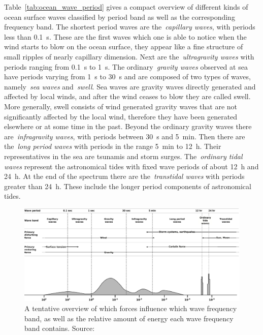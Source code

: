 Table~\ref{tab:ocean_wave_period} gives a compact overview of different kinds 
of ocean surface waves classified by period band as well as the corresponding 
frequency band. The shortest period waves are the~\emph{capillary waves}, with 
periods less than \SI{0.1}{\second}. These are the first waves which one is able to notice 
when the wind starts to blow on the ocean surface, they appear like a fine
structure of small ripples of nearly capillary dimension.
Next are the~\emph{ultragravity waves} with periods ranging from \SI{0.1}{\second}
to \SI{1}{\second}. The ordinary~\emph{gravity waves} observed at sea have periods
varying from \SI{1}{\second} to \SI{30}{\second} and are composed of two types
of waves, namely~\emph{sea waves} and~\emph{swell}.
Sea waves are gravity waves directly generated and affected by local winds,
and after the wind ceases to blow they are called swell.
More generally, swell
consists of wind generated gravity waves that are not significantly affected
by the local wind, therefore they have  been generated elsewhere or at some
time in the past.
Beyond the ordinary 
gravity waves there are~\emph{infragravity waves}, with periods between \SI{30}{\second} 
and \SI{5}{\minute}. Then there are the~\emph{long period waves} with periods in the 
range \SI{5}{\minute} to \SI{12}{\hour}. Their representatives in the sea are tsunamis 
and storm surges. The~\emph{ordinary tidal waves} represent the astronomical 
tides with fixed wave periods of about \SI{12}{\hour} and \SI{24}{\hour}. At the end of the 
spectrum there are the~\emph{transtidal waves} with periods greater than 
\SI{24}{\hour}. These include the longer period components of astronomical tides.
%
\begin{figure}
  \centering
  \includegraphics[width=\textwidth]{figures/SurfaceWavesEnergy}
  \caption[Wave frequency bands and their governing forces.]{
  A tentative overview of which forces influence which wave 
  frequency band, as well as the relative amount of energy
  each wave frequency band contains. Source: \citet{article:munkorigin}}
  \label{fig:surface_waves_energy}
\end{figure}
%

